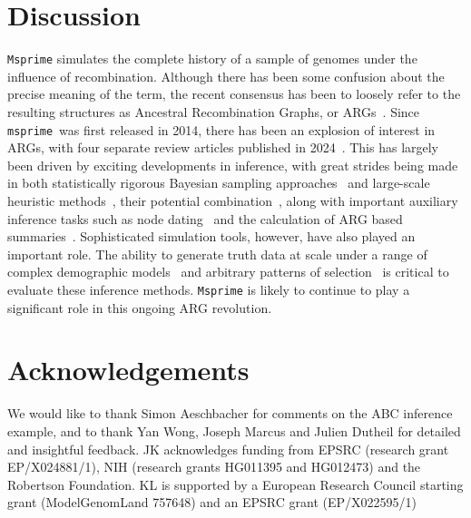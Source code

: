 \documentclass[graybox]{svmult}
\newcommand{\msprime}[0]{\texttt{msprime}}
\begin{document}
\section{Discussion}
\label{sec:discussion}
\texttt{Msprime} simulates the complete history of a sample of genomes under
the influence of recombination. Although there has been some confusion about
the precise meaning of the term, the recent consensus has been to loosely
refer to the resulting structures as Ancestral Recombination Graphs, or
ARGs~\citep{wong2024general}. Since \msprime\ was first released in 2014,
there has been an explosion of interest in ARGs, with four separate
review articles published in 2024~\citep{brandt2024promise,
lewanski2024era,nielsen2024inference,wong2024general}.
This has largely been driven by exciting developments in inference, with great strides being
made in both statistically rigorous Bayesian sampling
approaches~\citep{rasmussen2014genome,mahmoudi2022bayesian,deng2024robust}
and large-scale heuristic
methods~\cite{speidel2019method,kelleher2019inferring,
zhang2023biobank,gunnarsson2024scalable},
their potential combination~\citep{bisschop2025likelihoods},
along with important auxiliary inference tasks such as node
dating~\cite{wohns2022unified,deng2025general} 
and the calculation of ARG based summaries~\cite{ignatieva2025length}.
Sophisticated simulation tools, however, have also played an important
role. The ability to generate truth data at scale
under a range of complex demographic
models~\citep{adrion2020stdpopsim,gower2022demes,lauterbur2023expanding}
and arbitrary patterns of
selection~\citep{kelleher2018efficient,haller2018tree,gower2025accessible}
is critical to evaluate these inference methods.
\texttt{Msprime} is likely to continue to play a significant role
in this ongoing ARG revolution.

\section*{Acknowledgements}

We would like to thank Simon Aeschbacher for comments on the ABC inference example,
and to thank Yan Wong, Joseph Marcus and Julien Dutheil for
detailed and insightful feedback.
JK acknowledges funding from EPSRC (research grant EP/X024881/1),
NIH (research grants HG011395 and HG012473)
and the Robertson Foundation.
KL is supported by a European Research Council starting grant (ModelGenomLand 757648) and an EPSRC grant (EP/X022595/1)
\end{document}
